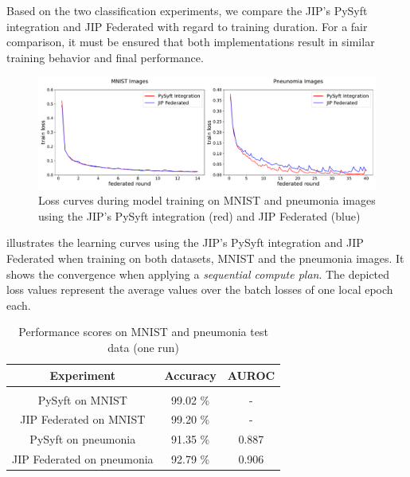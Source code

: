 Based on the two classification experiments, we compare the JIP's PySyft integration and JIP Federated with regard to training duration. For a fair comparison, it must be ensured that both implementations result in similar training behavior and final performance.

\begin{figure}[htbp]
    \centerline{\includegraphics[width=1.0\textwidth]{1_Figures/RuntimeExperiments_horizontal.pdf}}
    \caption[Loss curves during model training on MNIST and pneunomia images]{Loss curves during model training on MNIST and pneumonia images using the JIP's PySyft integration (red) and JIP Federated (blue)}
\label{fig:RuntimeExp}
\end{figure}

 illustrates the learning curves using the JIP's PySyft integration and JIP Federated when training on both datasets, MNIST and the pneumonia images. It shows the convergence when applying a \textit{sequential compute plan}. The depicted loss values represent the average values over the batch losses of one local epoch each.

\begin{table}[htbp]
  \centering
  \begin{tabular}{ccc}
  Experiment & Accuracy & AUROC \\
  \hline \\[-2.5ex] %
  PySyft on MNIST               & 99.02 \% & - \\
  JIP Federated on MNIST        & 99.20 \% & - \\
  PySyft on pneumonia           & 91.35 \% & 0.887 \\
  JIP Federated on pneumonia    & 92.79 \% & 0.906 \\
 \end{tabular}
 \caption[Performance scores on MNIST and pneunomia test data]{Performance scores on MNIST and pneumonia test data (one run)}
 \label{tab:Performance}
\end{table}

